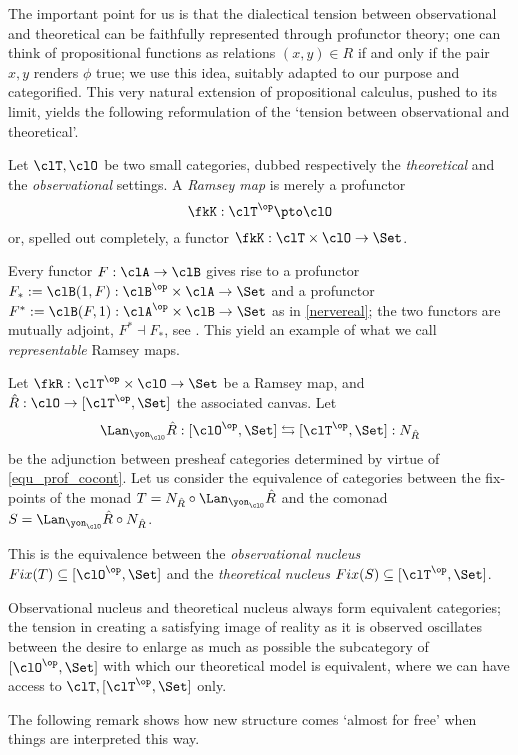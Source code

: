 The important point for us is that the dialectical tension between observational and theoretical can be faithfully represented through profunctor theory; one can think of propositional functions as relations $(x,y)\in R$ if and only if the pair $x,y$ renders $\phi$ true; we use this idea, suitably adapted to our purpose and categorified. This very natural extension of propositional calculus, pushed to its limit, yields the following reformulation of the `tension between observational and theoretical'.%
\begin{definition}\label{11_ramsey}
	Let $\clT,\clO$ be two small categories, dubbed respectively the \emph{theoretical} and the \emph{observational} settings. A \emph{Ramsey map} is merely a profunctor
	\[\fkK : \clT^\op \pto \clO\]
	or, spelled out completely, a functor $\fkK : \clT\times \clO \to \Set$.
\end{definition} 
\begin{example}
	Every functor $F : \clA \to \clB$ gives rise to a profunctor $F_* := \clB(1,F) : \clB^\op\times \clA\to\Set$ and a profunctor $F^* := \clB(F,1) : \clA^\op\times\clB \to \Set$ as in \autoref{nervereal}; the two functors are mutually adjoint, $F^*\dashv F_*$, see \cite[6.2]{Bor2}. This yield an example of what we call \emph{representable} Ramsey maps.
\end{example}
\begin{definition}\label{nuclei}
	Let $\fkR : \clT^\op\times \clO \to\Set$ be a Ramsey map, and $\hat R : \clO \to [\clT^\op,\Set]$ the associated canvas. Let
	\[ \label{lalan} \Lan_{\yon_\clO}\hat R : [\clO^\op,\Set] \leftrightarrows [\clT^\op,\Set] : N_{\hat R} \]
	be the adjunction between presheaf categories determined by virtue of \autoref{equ_prof_cocont}. Let us consider the equivalence of categories between the fix-points of the monad $T = N_{\hat R}\circ\Lan_{\yon_\clO}\hat R$ and the comonad $S=\Lan_{\yon_\clO}\hat R\circ N_{\hat R}$.
	
	This is the equivalence between the \emph{observational nucleus} $Fix(T)\subseteq [\clO^\op,\Set]$ and the \emph{theoretical nucleus} $Fix(S)\subseteq [\clT^\op,\Set]$.
\end{definition}
\begin{remark}
	Observational nucleus and theoretical nucleus always form equivalent categories; the tension in creating a satisfying image of reality as it is observed oscillates between the desire to enlarge as much as possible the subcategory of $[\clO^\op,\Set]$ with which our theoretical model is equivalent, where we can have access to $\clT, [\clT^\op, \Set]$ only.
\end{remark}
The following remark shows how new structure comes `almost for free' when things are interpreted this way. 

